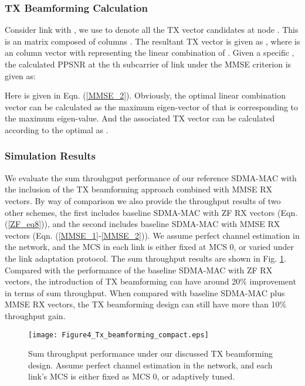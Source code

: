 \documentclass[journal, final]{IEEEtran}
\begin{document}
\subsubsection{TX Beamforming Calculation}

Consider link  with , we use  to denote all the TX vector candidates at node .
This is an  matrix composed of columns . The resultant TX vector is given as , where  is an  column vector with  representing the linear
combination of . Given a specific
, the calculated PPSNR at the th subcarrier of
link  under the MMSE criterion is given as:

Here  is given in Eqn. (\ref{MMSE_2}). Obviously,
the optimal linear combination vector  can be
calculated as the maximum eigen-vector of  that is corresponding to the maximum eigen-value. And
the associated TX vector  can be calculated
according to the optimal  as .

\subsubsection{Simulation Results}

We evaluate the sum throuhgput performance of our reference SDMA-MAC with
the inclusion of the TX beamforming approach combined with MMSE RX vectors. By way of comparison we
also provide the throughput results of two other schemes, the first includes
baseline SDMA-MAC with ZF RX vectors (Eqn. (\ref{ZF_eq8})), and the second includes baseline SDMA-MAC with MMSE RX vectors (Eqn. (\ref{MMSE_1}-\ref{MMSE_2})). We assume perfect channel estimation in the network,
and the MCS in each link is either fixed at MCS 0, or varied under the
link adaptation protocol. The sum throughput results are
shown in Fig. \ref{Fig4_Tx_beamforming}. Compared with the performance of the baseline SDMA-MAC
with ZF RX vectors, the introduction of TX
beamforming can have around 20{\%} improvement in terms of sum throughput.
When compared with baseline SDMA-MAC plus MMSE RX vectors,
the TX beamforming design can still have more than 10{\%} throughput gain.

\begin{figure}
\centering
\texttt{[image: Figure4\_Tx\_beamforming\_compact.eps]}
\caption{Sum throughput performance under our discussed TX beamforming design. Assume perfect channel estimation in the network, and each link's MCS is either fixed as MCS 0, or adaptively tuned.}
\label{Fig4_Tx_beamforming}
\end{figure}
\end{document}
